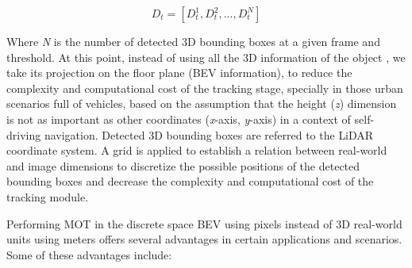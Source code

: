\begin{equation}
	\label{eq:4_smartmot_detection}
	D_{t} =[D_{t}^{1},D_{t}^{2}, ...,D_{t}^{N}]
\end{equation}

Where \textit{N} is the number of detected 3D bounding boxes at a given frame and threshold. At this point, instead of using all the 3D information of the object \cite{chiu2021probabilistic, weng20203d}, we take its projection on the floor plane (\ac{BEV} information), to reduce the complexity and computational cost of the tracking stage, specially in those urban scenarios full of vehicles, based on the assumption that the height (\textit{z}) dimension is not as important as other coordinates (\textit{x}-axis, \textit{y}-axis) in a context of self-driving navigation. Detected 3D bounding boxes are referred to the \ac{LiDAR} coordinate system. A grid is applied to establish a relation between real-world and image dimensions to discretize the possible positions of the detected bounding boxes and decrease the complexity and computational cost of the tracking module. 

Performing \ac{MOT} in the discrete space \ac{BEV} using pixels instead of 3D real-world units using meters offers several advantages in certain applications and scenarios. Some of these advantages include:


